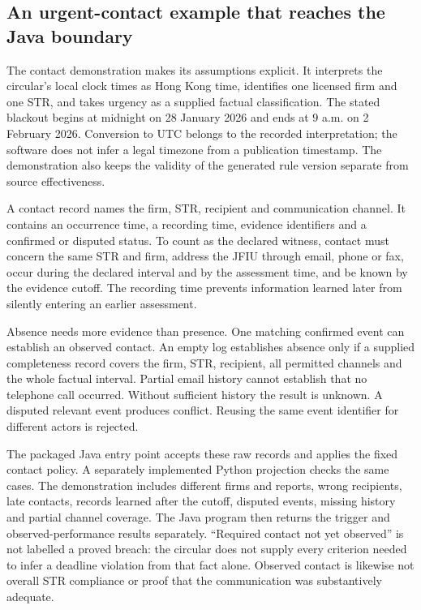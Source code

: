 \documentclass[12pt,a4paper,oneside,openany]{book}
\begin{document}
\subsection{An urgent-contact example that reaches the Java boundary}

The contact demonstration makes its assumptions explicit. It interprets the
circular's local clock times as Hong Kong time, identifies one licensed firm
and one STR, and takes urgency as a supplied factual classification. The stated
blackout begins at midnight on 28 January 2026 and ends at 9 a.m. on 2 February
2026. Conversion to UTC belongs to the recorded interpretation; the software
does not infer a legal timezone from a publication timestamp. The demonstration
also keeps the validity of the generated rule version separate from source
effectiveness.

A contact record names the firm, STR, recipient and communication channel. It
contains an occurrence time, a recording time, evidence identifiers and a
confirmed or disputed status. To count as the declared witness, contact must
concern the same STR and firm, address the JFIU through email, phone or fax,
occur during the declared interval and by the assessment time, and be known by
the evidence cutoff. The recording time prevents information learned later
from silently entering an earlier assessment.

Absence needs more evidence than presence. One matching confirmed event can
establish an observed contact. An empty log establishes absence only if a
supplied completeness record covers the firm, STR, recipient, all permitted
channels and the whole factual interval. Partial email history cannot establish
that no telephone call occurred. Without sufficient history the result is
unknown. A disputed relevant event produces conflict. Reusing the same event
identifier for different actors is rejected.

The packaged Java entry point accepts these raw records and applies the fixed
contact policy. A separately implemented Python projection checks the same
cases. The demonstration includes different firms and reports, wrong recipients,
late contacts, records learned after the cutoff, disputed events, missing
history and partial channel coverage. The Java program then returns the trigger
and observed-performance results separately. ``Required contact not yet
observed'' is not labelled a proved breach: the circular does not supply every
criterion needed to infer a deadline violation from that fact alone. Observed
contact is likewise not overall STR compliance or proof that the communication
was substantively adequate.
\end{document}
